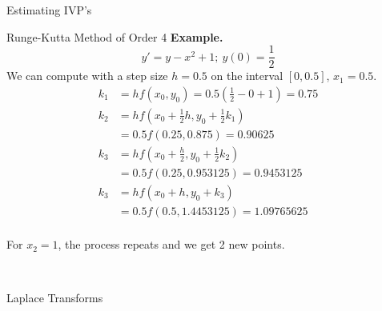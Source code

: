 \documentclass{article}
\newcommand{\ilaplace}[1]{\mathcal{L}^{-1}\left\{#1\right\}}
\begin{document}
\begin{multicols*}{3}
\begin{blackbox}{Estimating IVP's}
\begin{redbox}{Runge-Kutta Method of Order 4}
            \textbf{Example.} \\[-5ex]
            \[y' = y - x^2 + 1; \ y(0) = \frac{1}{2}\]            
            We can compute with a step size $h = 0.5$ on the interval $[0,0.5]$, $x_1 = 0.5$.
            \vspace{-2ex}
            {\footnotesize
            \begin{align*}
                k_1 &= hf(x_0, y_0) = 0.5\left(\frac{1}{2} - 0 + 1\right) = 0.75\\
                k_2 &= hf\left(x_0 + \frac{1}{2}h, y_0 + \frac{1}{2}k_1\right)\\
                &= 0.5f(0.25,0.875) = 0.90625\\
                k_3 &= hf\left(x_0 + \frac{h}{2}, y_0 + \frac{1}{2}k_2\right)\\
                &= 0.5f(0.25, 0.953125) = 0.9453125\\
                k_3 &= hf\left(x_0 + h, y_0 + k_3\right)\\
                &= 0.5f(0.5, 1.4453125) = 1.09765625\\
            \end{align*}
            \vspace{-8ex}
            }

            For $x_2 = 1$, the process repeats and we get 2 new points. 
            \end{redbox}\\[-2ex]
        \end{blackbox}
        \begin{blackbox}{Laplace Transforms}


\end{blackbox}
\end{multicols*}
\end{document}
